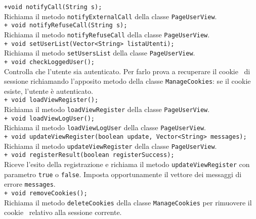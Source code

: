 {{\begin{sloppypar}
{{{\begin{itemize}
{					\texttt{+void notifyCall(String s);}\\
					Richiama il metodo \texttt{notifyExternalCall} della classe \texttt{PageUserView}.\\

					\texttt{+ void notifyRefuseCall(String s);}\\
					Richiama il metodo \texttt{notifyRefuseCall} della classe \texttt{PageUserView}.\\

					\texttt{+ void setUserList(Vector<String> listaUtenti);}\\
					Richiama il metodo \texttt{setUsersList} della classe \texttt{PageUserView}.\\
					
					\texttt{+ void checkLoggedUser();}\\
					Controlla che l'utente sia autenticato. Per farlo prova a recuperare il cookie\g~ di sessione richiamando l'apposito metodo della classe \texttt{ManageCookies}: se il cookie\g~ esiste, l'utente è autenticato.\\
					
					\texttt{+ void loadViewRegister();}\\
					Richiama il metodo \texttt{loadViewRegister} della classe \texttt{PageUserView}.\\
					
					\texttt{+ void loadViewLogUser();}\\
					Richiama il metodo \texttt{loadViewLogUser} della classe \texttt{PageUserView}.\\
					
					\texttt{+ void updateViewRegister(boolean update, Vector<String> messages);}\\
					Richiama il metodo \texttt{updateViewRegister} della classe \texttt{PageUserView}.\\
					
					\texttt{+ void registerResult(boolean registerSuccess);}\\
					Riceve l'esito della registrazione e richiama il metodo \texttt{updateViewRegister} con parametro \texttt{true} o \texttt{false}. Imposta opportunamente il vettore dei messaggi di errore \texttt{messages}.\\

					\texttt{+ void removeCookies();}\\
					Richiama il metodo \texttt{deleteCookies} della classe \texttt{ManageCookies} per rimuovere il cookie\g~ relativo alla sessione corrente.\\

}
\end{itemize}}}}
\end{sloppypar}}}
